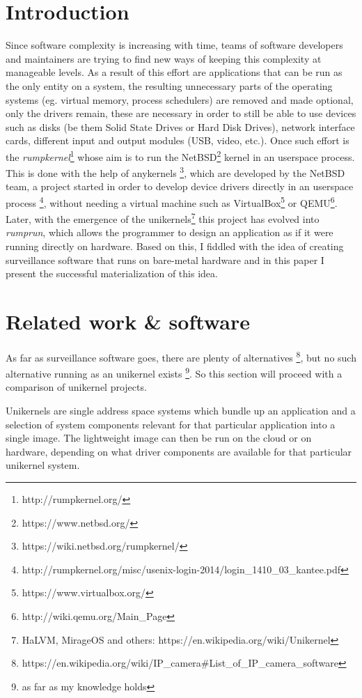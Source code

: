 \documentclass[10pt,a4paper,twoside]{article}
\begin{document}
\section{Introduction}
Since software complexity is increasing with time, teams of software developers and maintainers are trying to
find new ways of keeping this complexity at manageable levels. As a result of this effort are applications
that can be run as the only entity on a system,
the resulting unnecessary parts of the operating systems (eg. virtual memory, process schedulers) are removed and made
optional, only the drivers
remain, these are necessary in order to still be able to use devices
such as disks (be them Solid State Drives or Hard Disk Drives), network interface cards, different input and
output modules (USB, video, etc.).
Once such effort is the \textit{rumpkernel}\footnote{http://rumpkernel.org/}
 whose aim is to run the NetBSD\footnote{https://www.netbsd.org/} kernel in an userspace process.
 This is done with the help of anykernels \footnote{https://wiki.netbsd.org/rumpkernel/}, which are developed
 by the NetBSD team, a project started in order to develop device drivers directly in an userspace process
 \footnote{http://rumpkernel.org/misc/usenix-login-2014/login\_1410\_03\_kantee.pdf}, without needing a virtual machine such as VirtualBox\footnote{https://www.virtualbox.org/} or QEMU\footnote{http://wiki.qemu.org/Main\_Page}.
Later, with the emergence of the unikernels\footnote{HaLVM, MirageOS and others: https://en.wikipedia.org/wiki/Unikernel} this project has evolved into \textit{rumprun}, which allows the programmer to design an application as if it were running directly on hardware. Based on this, I fiddled with the idea of creating surveillance software that runs on bare-metal hardware and in this paper I present the successful materialization of this idea.

\section{Related work \& software}
As far as surveillance software goes, there are plenty of alternatives
\footnote{https://en.wikipedia.org/wiki/IP\_camera\#List\_of\_IP\_camera\_software},
 but no such alternative running as an unikernel exists
 \footnote{as far as my knowledge holds}.
 So this section will proceed with a comparison of unikernel projects.

Unikernels are single address space systems which bundle up an application and a
selection of system components relevant for that particular application into a single image.
The lightweight image can then be run on the cloud or on hardware, depending on what driver
components are available for that particular unikernel system.
\end{document}
